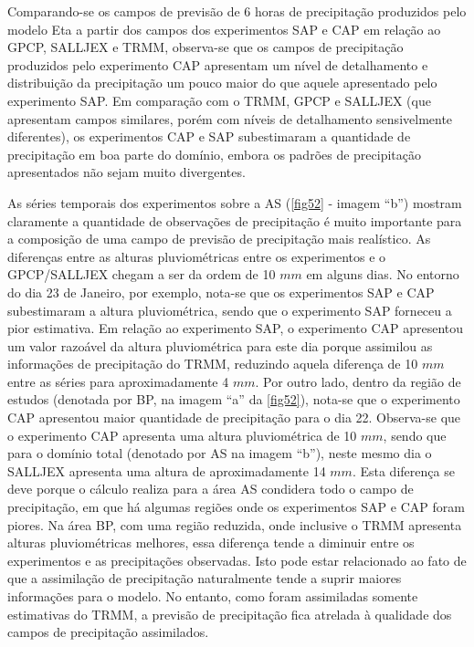 Comparando-se os campos de previsão de 6 horas de precipitação produzidos pelo modelo Eta a partir dos campos dos experimentos SAP e CAP em relação ao GPCP, SALLJEX e TRMM, observa-se que os campos de precipitação produzidos pelo experimento CAP apresentam um nível de detalhamento e distribuição da precipitação um pouco maior do que aquele apresentado pelo experimento SAP. Em comparação com o TRMM, GPCP e SALLJEX (que apresentam campos similares, porém com níveis de detalhamento sensivelmente diferentes), os experimentos CAP e SAP subestimaram a quantidade de precipitação em boa parte do domínio, embora os padrões de precipitação apresentados não sejam muito divergentes. 

As séries temporais dos experimentos sobre a AS (\autoref{fig52} - imagem ``b'') mostram claramente a quantidade de observações de precipitação é muito importante para a composição de uma campo de previsão de precipitação mais realístico. As diferenças entre as alturas pluviométricas entre os experimentos e o GPCP/SALLJEX chegam a ser da ordem de 10 $mm$ em alguns dias. No entorno do dia 23 de Janeiro, por exemplo, nota-se que os experimentos SAP e CAP subestimaram a altura pluviométrica, sendo que o experimento SAP forneceu a pior estimativa.  Em relação ao experimento SAP, o experimento CAP apresentou um valor razoável da altura pluviométrica para este dia porque assimilou as informações de precipitação do TRMM, reduzindo aquela diferença de 10 $mm$ entre as séries para aproximadamente 4 $mm$. Por outro lado, dentro da região de estudos (denotada por BP, na imagem ``a'' da \autoref{fig52}), nota-se que o experimento CAP apresentou maior quantidade de precipitação para o dia 22. Observa-se que o experimento CAP apresenta uma altura pluviométrica de 10 $mm$, sendo que para o domínio total (denotado por AS na imagem ``b''), neste mesmo dia o SALLJEX apresenta uma altura de aproximadamente 14 $mm$. Esta diferença se deve porque o cálculo realiza para a área AS condidera todo o campo de precipitação, em que há algumas regiões onde os experimentos SAP e CAP foram piores. Na área BP, com uma região reduzida, onde inclusive o TRMM apresenta alturas pluviométricas melhores, essa diferença tende a diminuir entre os experimentos e as precipitações observadas. Isto pode estar relacionado ao fato de que a assimilação de precipitação naturalmente tende a suprir maiores informações para o modelo. No entanto, como foram assimiladas somente estimativas do TRMM, a previsão de precipitação fica atrelada à qualidade dos campos de precipitação assimilados. 

